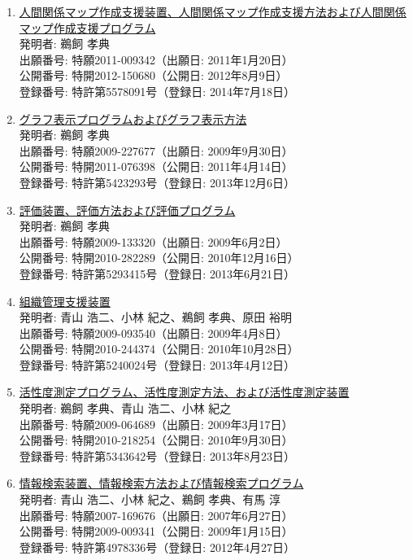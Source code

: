 \documentclass[dvipdfmx]{jlreq}
\begin{document}
\begin{enumerate}[label=\arabic*,align=parleft]
\begin{enumerate}
\item \href{https://jglobal.jst.go.jp/detail?JGLOBAL_ID=201403037821015061}{人間関係マップ作成支援装置、人間関係マップ作成支援方法および人間関係マップ作成支援プログラム}\\発明者: 鵜飼 孝典\\出願番号: 特願2011-009342（出願日: 2011年1月20日）\\公開番号: 特開2012-150680（公開日: 2012年8月9日）\\登録番号: 特許第5578091号（登録日: 2014年7月18日）
\item \href{https://jglobal.jst.go.jp/detail?JGLOBAL_ID=201403061874649621}{グラフ表示プログラムおよびグラフ表示方法}\\発明者: 鵜飼 孝典\\出願番号: 特願2009-227677（出願日: 2009年9月30日）\\公開番号: 特開2011-076398（公開日: 2011年4月14日）\\登録番号: 特許第5423293号（登録日: 2013年12月6日）
\item \href{https://jglobal.jst.go.jp/detail?JGLOBAL_ID=201303083316514686}{評価装置、評価方法および評価プログラム}\\発明者: 鵜飼 孝典\\出願番号: 特願2009-133320（出願日: 2009年6月2日）\\公開番号: 特開2010-282289（公開日: 2010年12月16日）\\登録番号: 特許第5293415号（登録日: 2013年6月21日）
\item \href{https://jglobal.jst.go.jp/detail?JGLOBAL_ID=201303029230413076}{組織管理支援装置}\\発明者: 青山 浩二、小林 紀之、鵜飼 孝典、原田 裕明\\出願番号: 特願2009-093540（出願日: 2009年4月8日）\\公開番号: 特開2010-244374（公開日: 2010年10月28日）\\登録番号: 特許第5240024号（登録日: 2013年4月12日）
\item \href{https://patents.google.com/patent/JP2010218254A/ja}{活性度測定プログラム、活性度測定方法、および活性度測定装置}\\発明者: 鵜飼 孝典、青山 浩二、小林 紀之\\出願番号: 特願2009-064689（出願日: 2009年3月17日）\\公開番号: 特開2010-218254（公開日: 2010年9月30日）\\登録番号: 特許第5343642号（登録日: 2013年8月23日）
\item \href{https://jglobal.jst.go.jp/detail?JGLOBAL_ID=201303021712200524}{情報検索装置、情報検索方法および情報検索プログラム}\\発明者: 青山 浩二、小林 紀之、鵜飼 孝典、有馬 淳\\出願番号: 特願2007-169676（出願日: 2007年6月27日）\\公開番号: 特開2009-009341（公開日: 2009年1月15日）\\登録番号: 特許第4978336号（登録日: 2012年4月27日）

\end{enumerate}
\end{enumerate}
\end{document}
